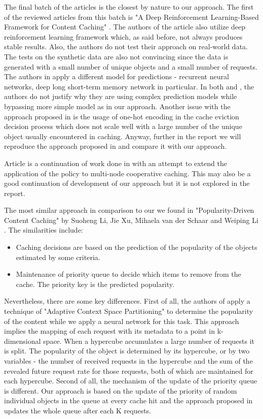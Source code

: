 The final batch of the articles is the closest by nature to our approach. The first of the reviewed articles from this batch is "A Deep Reinforcement Learning-Based Framework for Content Caching" \cite{22}. The authors of the article also utilize deep reinforcement learning framework which, as said before, not always produces stable results. Also, the authors do not test their approach on real-world data. The tests on the synthetic data are also not convincing since the data is generated with a small number of unique objects and a small number of requests. The authors in \cite{23} apply a different model for predictions - recurrent neural networks, deep long short-term memory network in particular. In both \cite{22} and \cite{23}, the authors do not justify why they are using complex prediction models while bypassing more simple model as in our approach. Another issue with the approach proposed in \cite{23} is the usage of one-hot encoding in the cache eviction decision process which does not scale well with a large number of the unique object usually encountered in caching. Anyway, further in the report we will reproduce the approach proposed in \cite{23} and compare it with our approach. 

Article \cite{24} is a continuation of work done in \cite{23} with an attempt to extend the application of the policy to multi-node cooperative caching. This may also be a good continuation of development of our approach but it is not explored in the report.


The most similar approach in comparison to our we found in "Popularity-Driven Content Caching" by Suoheng Li, Jie Xu, Mihaela van der Schaar and Weiping Li \cite{25}. The similarities include:
\begin{itemize}
	\item Caching decisions are based on the prediction of the popularity of the objects estimated by some criteria.
	\item Maintenance of priority queue to decide which items to remove from the cache. The priority key is the predicted popularity.
\end{itemize}
Nevertheless, there are some key differences. First of all, the authors of \cite{25} apply a technique of "Adaptive Context Space Partitioning" to determine the popularity of the content while we apply a neural network for this task. This approach implies the mapping of each request with its metadata to a point in k-dimensional space. When a hypercube accumulates a large number of requests it is split. The popularity of the object is determined by its hypercube, or by two variables - the number of received requests in the hypercube and the sum of the revealed future request rate for those requests, both of which are maintained for each hypercube. Second of all, the mechanism of the update of the priority queue is different. Our approach is based on the update of the priority of random individual objects in the queue at every cache hit and the approach proposed in \cite{25} updates the whole queue after each K requests.

